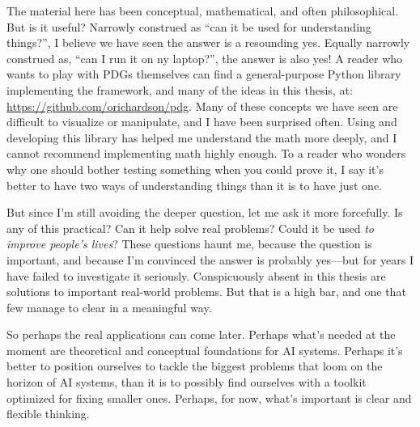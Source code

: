The material here has been conceptual, mathematical, and often philosophical.
But is it useful?
Narrowly construed as ``can it be used for understanding things?'', I believe we have seen the answer is a resounding yes. 
Equally narrowly construed as, ``can I run it on ny laptop?'', the answer is also yes! 
A reader who wants to play with PDGs themselves can find a general-purpose Python library implementing the framework, and many of the ideas in this thesis, at:
\url{https://github.com/orichardson/pdg}.
%
Many of these concepts we have seen are difficult to visualize or manipulate, and I have been surprised often.
Using and developing this library has helped me understand the math more deeply, and I cannot recommend implementing math highly enough. 
To a reader who wonders why one should bother testing something when you could prove it, I say it's better to have two ways of understanding things than it is to have just one. 

%


But since I'm still avoiding the deeper question, let me ask it more forcefully.
Is any of this practical? Can it help solve real problems? Could it be used \emph{to improve people's lives}? 
These questions haunt me, because the question is important, and because I'm convinced the answer is probably yes---but for years I have failed to investigate it seriously.  
Conspicuously absent in this thesis are solutions to important real-world problems. 
But that is a high bar, and one that few manage to clear in a meaningful way. 

So perhaps the real applications can come later. 
Perhaps what's needed at the moment are theoretical and conceptual foundations for AI systems. 
% 
Perhaps it's better to position ourselves to tackle the biggest problems that loom on the horizon of AI systems, than it is to possibly find ourselves with a toolkit optimized for fixing smaller ones. 
Perhaps, for now, what's important is clear and flexible thinking. 


